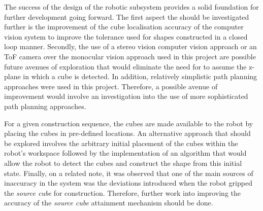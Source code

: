 The success of the design of the robotic subsystem provides a solid foundation for further development going forward. The first aspect the should be investigated further is the improvement of the cube localisation accuracy of the computer vision system to improve the tolerance used for shapes constructed in a closed loop manner. Secondly, the use of a stereo vision computer vision approach or an ToF camera over the monocular vision approach used in this project are possible future avenues of exploration that would eliminate the need for to assume the z-plane in which a cube is detected. In addition, relatively simplistic path planning approaches were used in this project. Therefore, a possible avenue of improvement would involve an investigation into the use of more sophisticated path planning approaches. 

For a given construction sequence, the cubes are made available to the robot by placing the cubes in pre-defined locations. An alternative approach that should be explored involves the arbitrary initial placement of the cubes within the robot's workspace followed by the implementation of an algorithm that would allow the robot to detect the cubes and construct the shape from this initial state. Finally, on a related note, it was observed that one of the main sources of inaccuracy in the system was the deviations introduced when the robot gripped the \textit{source cube} for construction. Therefore, further work into improving the accuracy of the \textit{source cube} attainment mechanism should be done.

\newpage



